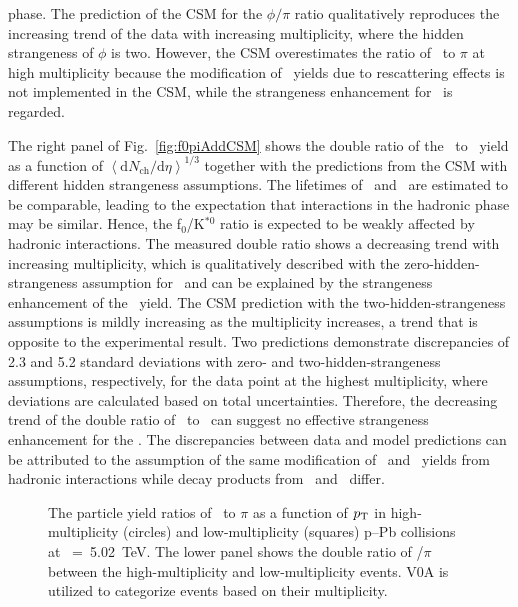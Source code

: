 phase. The prediction of the CSM for the $\phi/\pi$ ratio qualitatively reproduces the increasing trend of the data with increasing multiplicity, where the hidden strangeness of $\phi$ is two. However, the CSM overestimates the ratio of \kstar~to $\pi$ at high multiplicity because the modification of \kstar~yields due to rescattering effects is not implemented in the CSM, while the strangeness enhancement for \kstar~is regarded.

The right panel of Fig.~\ref{fig:f0piAddCSM} shows the double ratio of the \fzero~to \kstar~yield as a function of $\left\langle \mathrm{d}N_{\mathrm{ch}}/\mathrm{d}\eta \right\rangle^{1/3}$ together with the predictions from the CSM with different hidden strangeness assumptions. The lifetimes of \fzero~and \kstar~are estimated to be comparable, leading to the expectation that interactions in the hadronic phase may be similar. Hence, the f$_{0}$/K$^{*0}$ ratio is expected to be weakly affected by hadronic interactions. The measured double ratio shows a decreasing trend with increasing multiplicity, which is qualitatively described with the zero-hidden-strangeness assumption for \fzero~and can be explained by the strangeness enhancement of the \kstar~yield. The CSM prediction with the two-hidden-strangeness assumptions is mildly increasing as the multiplicity increases, a trend that is opposite to the experimental result. Two predictions demonstrate discrepancies of 2.3 and 5.2 standard deviations with zero- and two-hidden-strangeness assumptions, respectively, for the data point at the highest multiplicity, where deviations are calculated based on total uncertainties. Therefore, the decreasing trend of the double ratio of \fzero~to \kstar~can suggest no effective strangeness enhancement for the \fzero. The discrepancies between data and model predictions can be attributed to the assumption of the same modification of \fzero~and \kstar~yields from hadronic interactions while decay products from \fzero~and \kstar~differ.

\begin{figure}[!hbt]
	\centering
	\caption{ The particle yield ratios of \fzero~to $\pi$ as a function of $p_{\rm{T}}$ in high-multiplicity (circles) and low-multiplicity (squares) p--Pb collisions at \snn~=~5.02~TeV. The lower panel shows the double ratio of \fzero/$\pi$ between the high-multiplicity and low-multiplicity events. V0A is utilized to categorize events based on their multiplicity.}
	\label{fig:f0piPt}
\end{figure}

